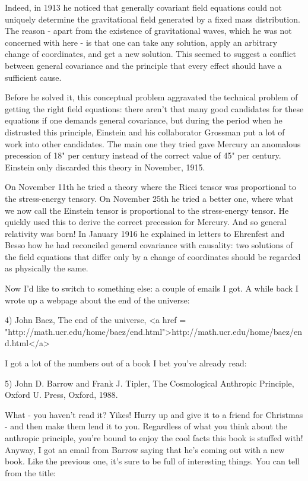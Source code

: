 Indeed, in 1913 he noticed that generally covariant field equations
could not uniquely determine the gravitational field generated by a
fixed mass distribution.  The reason - apart from the existence of
gravitational waves, which he was not concerned with here - is that one
can take any solution, apply an arbitrary change of coordinates, and get
a new solution.  This seemed to suggest a conflict between general
covariance and the principle that every effect should have a sufficient
cause.  

Before he solved it, this conceptual problem aggravated the technical
problem of getting the right field equations: there aren't that many
good candidates for these equations if one demands general covariance,
but during the period when he distrusted this principle, Einstein and
his collaborator Grossman put a lot of work into other candidates.  The
main one they tried gave Mercury an anomalous precession of 18" per
century instead of the correct value of 45" per century.  Einstein only
discarded this theory in November, 1915.  

On November 11th he tried a theory where the Ricci tensor was proportional 
to the stress-energy tensory.  On November 25th he tried a better one,
where what we now call the Einstein tensor is proportional to the
stress-energy tensor.  He quickly used this to derive the correct
precession for Mercury.  And so general relativity was born!  In January
1916 he explained in letters to Ehrenfest and Besso how he had
reconciled general covariance with causality: two solutions of the
field equations that differ only by a change of coordinates should be
regarded as physically the same.

Now I'd like to switch to something else: a couple of emails I got.   
A while back I wrote up a webpage about the end of the universe:

4) John Baez, The end of the universe, <a href = "http://math.ucr.edu/home/baez/end.html">http://math.ucr.edu/home/baez/end.html</a>

I got a lot of the numbers out of a book I bet you've already read:

5) John D. Barrow and Frank J. Tipler, The Cosmological Anthropic 
Principle, Oxford U. Press, Oxford, 1988.

What - you haven't read it?  Yikes!  Hurry up and give it to a friend
for Christmas - and then make them lend it to you.  Regardless of what
you think about the anthropic principle, you're bound to enjoy the cool
facts this book is stuffed with!  Anyway, I got an email from Barrow
saying that he's coming out with a new book.  Like the previous one,
it's sure to be full of interesting things.  You can tell from the title:

